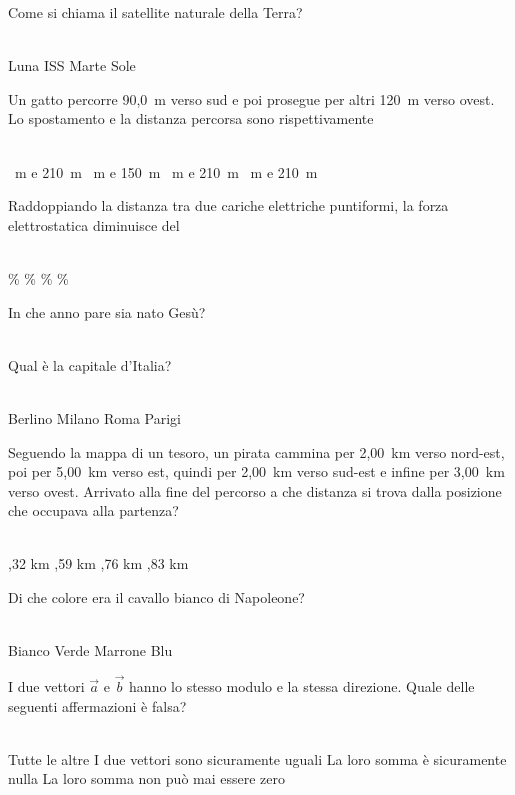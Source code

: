 \documentclass[a4paper,11pt]{exam}
\begin{document}
\begin{questions}
    
\question Come si chiama il satellite naturale della Terra?\\\
\begin{oneparchoices}
  \choice Luna
  \choice ISS
  \choice Marte
  \choice Sole
\end{oneparchoices}

    
\question Un gatto percorre 90,0~m verso sud e poi prosegue per altri 120~m verso ovest. Lo spostamento e la distanza percorsa sono rispettivamente\\\
\begin{oneparchoices}
  \choice 30~m e 210~m
  ~m e 150~m
  \choice 210~m e 210~m
  ~m e 210~m
\end{oneparchoices}

    
\question Raddoppiando la distanza tra due cariche elettriche puntiformi, la forza elettrostatica diminuisce del\\\
\begin{oneparchoices}
  \choice 25\%
  \choice 75\%
  \%
  \%
\end{oneparchoices}

    
\question In che anno pare sia nato Gesù?\\\
\begin{oneparchoices}
  \choice -80
  \choice 0
  \choice 20
\end{oneparchoices}

    
\question Qual è la capitale d’Italia?\\\
\begin{oneparchoices}
  \choice Berlino
  \choice Milano
  \choice Roma
  \choice Parigi
\end{oneparchoices}

    
\question Seguendo la mappa di un tesoro, un pirata cammina per 2,00~km verso nord-est, poi per 5,00~km verso est, quindi per 2,00~km verso sud-est e infine per 3,00~km verso ovest. Arrivato alla fine del percorso a che distanza si trova dalla posizione che occupava alla partenza?\\\
\begin{oneparchoices}
  \choice 6,32 km
  \choice 4,59 km
  \choice 4,76 km
  \choice 4,83 km
\end{oneparchoices}

    
\question Di che colore era il cavallo bianco di Napoleone?\\\
\begin{oneparchoices}
  \choice Bianco
  \choice Verde
  \choice Marrone
  \choice Blu 
\end{oneparchoices}

    
\question I due vettori $\vec{a}$ e $\vec{b}$ hanno lo stesso modulo e la stessa direzione. Quale delle seguenti affermazioni è falsa?\\\
\begin{oneparchoices}
  \choice Tutte le altre
  \choice I due vettori sono sicuramente uguali
  \choice La loro somma è sicuramente nulla
  \choice La loro somma non può mai essere zero
\end{oneparchoices}

    
\end{questions}
\end{document}
